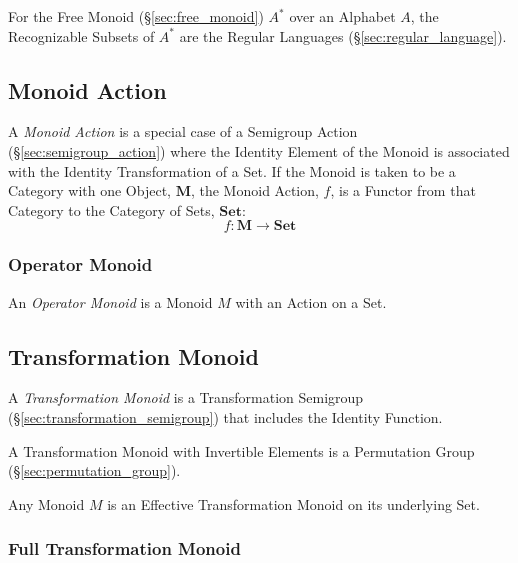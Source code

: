 For the Free Monoid (\S\ref{sec:free_monoid}) $A^*$ over an Alphabet
$A$, the Recognizable Subsets of $A^*$ are the Regular Languages
(\S\ref{sec:regular_language}).



\subsection{Monoid Action}\label{sec:monoid_action}

A \emph{Monoid Action} is a special case of a Semigroup Action
(\S\ref{sec:semigroup_action}) where the Identity Element of the
Monoid is associated with the Identity Transformation of a Set. If the
Monoid is taken to be a Category with one Object, $\mathbf{M}$, the
Monoid Action, $f$, is a Functor from that Category to the Category of
Sets, $\mathbf{Set}$:
\[
  f : \mathbf{M} \rightarrow \mathbf{Set}
\]


\subsubsection{Operator Monoid}\label{sec:operator_monoid}

An \emph{Operator Monoid} is a Monoid $M$ with an Action on a Set.



\subsection{Transformation Monoid}\label{sec:transformation_monoid}

A \emph{Transformation Monoid} is a Transformation Semigroup
(\S\ref{sec:transformation_semigroup}) that includes the Identity
Function.

A Transformation Monoid with Invertible Elements is a Permutation
Group (\S\ref{sec:permutation_group}).

Any Monoid $M$ is an Effective Transformation Monoid on its underlying
Set.



\subsubsection{Full Transformation Monoid}\label{sec:full_transformation}

